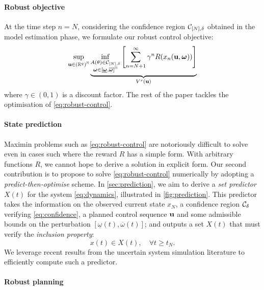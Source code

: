 \paragraph{Robust objective}

At the time step $n=N$, considering the confidence region $\mathcal{C}_{[N],\delta}$ obtained in the model estimation phase, we formulate our robust control objective:
\begin{equation}
\label{eq:robust-control}
\sup_{\mathbf{u}\in{(\mathbb{R}^q)}^{\mathbb{N}}} \underbrace{\inf_{\substack{A(\theta) \in \mathcal{C}_{[N],\delta} \\ \bm{\omega}\in[\underline{\bm{\omega}},\overline{\bm{\omega}}]^{\mathbb{N}}}} \left[\sum_{n=N+1}^\infty \gamma^n R(x_n(\mathbf{u},\bm{\omega}))\right]}_{V^r(\mathbf{u})}
\end{equation}
where $\gamma\in(0,1)$ is a discount factor. The rest of the paper tackles the optimisation of \eqref{eq:robust-control}.

\paragraph{State prediction}

Maximin problems such as \eqref{eq:robust-control} are notoriously difficult to solve even in cases such where the reward $R$ has a simple form. With arbitrary functions $R$, we cannot hope to derive a solution in explicit form. Our second contribution is to propose to solve \eqref{eq:robust-control} numerically by adopting a \emph{predict-then-optimise} scheme. In \autoref{sec:prediction}, we aim to derive a \emph{set predictor} $X(t)$ for the system \eqref{eq:dynamics}, illustrated in \autoref{fig:prediction}. This predictor takes the information on the observed current state ${x}_N$, a confidence region $\mathcal{C}_\delta$ verifying \eqref{eq:confidence}, a planned control sequence $\mathbf{u}$ and some admissible bounds on the perturbation $[\underline{\omega}(t),\overline{\omega}(t)]$; and outputs a set $X(t)$ that must verify the \emph{inclusion property}:
\begin{equation}
\label{eq:inclusion-generic}
x(t)\in X(t),\quad\forall t\geq t_N.
\end{equation}
We leverage recent results from the uncertain system simulation literature to efficiently compute such a predictor.

\paragraph{Robust planning}

